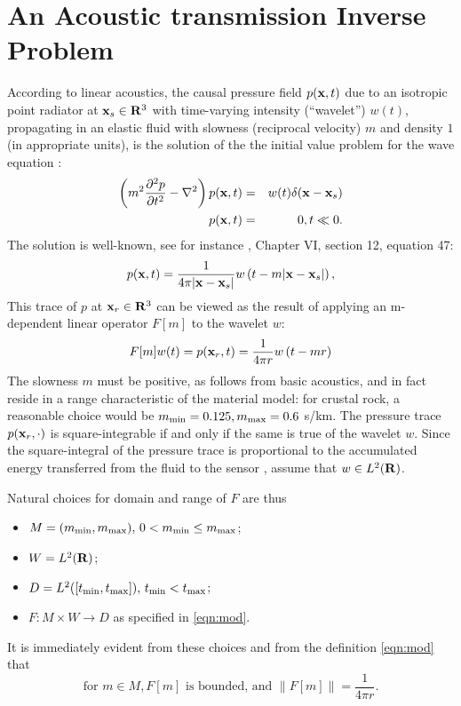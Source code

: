\section{An Acoustic transmission Inverse Problem}
According to linear acoustics, the causal pressure field $p({\bf x},t)$ due to an
isotropic point radiator at ${\bf x}_s \in {\bf R}^3$ with time-varying
intensity (``wavelet'') $w(t)$, propagating in an elastic fluid with
slowness (reciprocal velocity) $m$ and density $1$ (in appropriate
units), is the solution of the the initial value problem for the wave equation \cite[]{Frie:58}:
\begin{eqnarray}
  \label{eqn:awe}
  \left(m^2\frac{\partial^2 p}{\partial t^2} - \nabla^2\right) p({\bf x},t) &=&
                                                                         w(t)\delta({\bf x}-{\bf x}_s) \nonumber\\
  p({\bf x},t)&=&0, t\ll 0.
\end{eqnarray}
The solution is well-known, see for instance
\cite{CourHil:62}, Chapter VI, section 12, equation 47:
\begin{equation}
  \label{eqn:homsol}
  p({\bf x},t) = \frac{1}{4\pi |{\bf x}-{\bf x}_s|}w\left(t-m|{\bf x}-{\bf x}_s|\right),
\end{equation}
This trace of $p$ at ${\bf x}_r \in {\bf R}^3$ can be viewed as the result of
applying an m-dependent linear operator $F[m]$ to the wavelet $w$:
\begin{equation}
\label{eqn:mod}
F[m]w(t)  = p({\bf x}_r,t) = \frac{1}{4\pi r}w\left(t-mr\right) 
\end{equation}
The slowness $m$ must be positive, as follows from basic acoustics,
and in fact reside in a range characteristic of the
material model: for crustal rock, a reasonable choice would be
$m_{\rm min}=0.125, m_{\rm max}=0.6$ s/km. The pressure trace
$p({\bf x}_r,\cdot)$ is square-integrable if and only if the same is true
of the wavelet $w$. Since the square-integral of the pressure trace is
proportional to the accumulated energy transferred from the fluid to
the sensor \cite[]{SantosaSymes:00}, assume that $w \in L^2({\bf R})$.

Natural choices for domain and
range of $F$ are thus
\begin{itemize}
\item $M=(m_{\rm min}, m_{\rm max}),\,0 < m_{\rm min} \le m_{\rm
    max}$;
\item $W = L^2({\bf R})$;
\item $D=L^2([t_{\rm min},t_{\rm max}]),\, t_{\rm min}<t_{\rm max}$;
\item $F: M \times W \rightarrow D$ as specified in \ref{eqn:mod}.
\end{itemize}
It is immediately evident from these choices and from the definition
\ref{eqn:mod} that
\begin{equation}
  \label{eqn:mapprop}
  \mbox{for }m \in M, F[m] \mbox{ is bounded, and }\|F[m]\| =
  \frac{1}{4\pi r}.
\end{equation}

